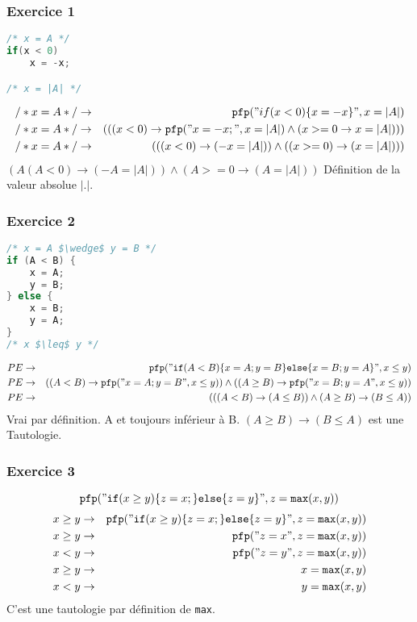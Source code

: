 	\subsubsection{Exercice 1}
\begin{lstlisting}[language=C]
/* x = A */
if(x < 0)
	x = -x;

/* x = |A| */
\end{lstlisting}

\begin{eqnarray*}
	/*x = A*/ &\rightarrow& \pfp ("if(x < 0)\{ x = -x \}", x = |A|)\\
	/*x = A*/ &\rightarrow& (((x<0)\rightarrow \pfp ("x=-x;", x = |A| ) \wedge (x >= 0 \rightarrow x = |A|)))\\
	/*x = A*/ &\rightarrow& (((x < 0) \rightarrow (-x = |A|)) \wedge (( x >= 0) \rightarrow (x = |A|)))\\
\end{eqnarray*}
$( A ( A < 0) \rightarrow (-A = |A|) ) \wedge (A >= 0 \rightarrow (A=|A|))$
Définition de la valeur absolue $|.|$.

\subsubsection{Exercice 2}
\begin{lstlisting}[language=C]
/* x = A $\wedge$ y = B */
if (A < B) {
	x = A;
	y = B;
} else {
	x = B;
	y = A;
}
/* x $\leq$ y */ 
\end{lstlisting}
\begin{eqnarray*}
	PE &\rightarrow& \pfp ("\ifp (A < B) \{ x = A; y = B\}\elsep \{ x = B; y =A\}", x \leq y)\\
PE&\rightarrow&((A<B)\rightarrow\pfp("x=A;y=B",x\leq y))\wedge((A\geq B)\rightarrow\pfp("x=B;y=A",x\leq y))\\
	PE &\rightarrow& ((( A < B) \rightarrow (A \leq B)) \wedge (A \geq B ) \rightarrow (B \leq A))
\end{eqnarray*}
Vrai par définition. A et toujours inférieur à B. $(A \geq B) \rightarrow (B \leq A)$ est une Tautologie. 
\subsubsection{Exercice 3}
$$\pfp ("\ifp (x \geq y )\{z=x;\}\elsep\{z=y\}",z=\texttt{max}(x,y))$$
\begin{eqnarray*}
x \geq y  &\rightarrow&	\pfp ("\ifp (x \geq y )\{z=x;\}\elsep\{z=y\}",z=\texttt{max}(x,y))\\
x \geq y &\rightarrow& \pfp ("z = x", z = \texttt{max}(x,y))\\
x < y &\rightarrow& \pfp ("z = y", z = \texttt{max}(x,y))\\
x \geq y &\rightarrow& x = \texttt{max}(x,y)\\
x < y &\rightarrow& y = \texttt{max}(x,y)
\end{eqnarray*}
C'est une tautologie par définition de \texttt{max}.

